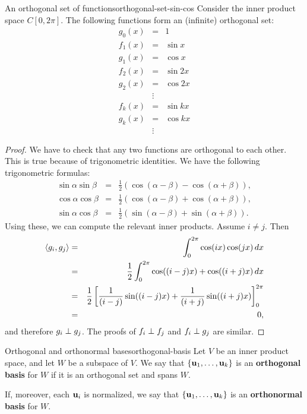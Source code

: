 \begin{example}{An orthogonal set of functions}{orthogonal-set-sin-cos}
  Consider the inner product space $C[0,2\pi]$. The following
  functions form an (infinite) orthogonal set:
  \begin{eqnarray*}
    g_0(x) &=& 1 \\
    f_1(x) &=& \sin x \\
    g_1(x) &=& \cos x \\
    f_2(x) &=& \sin 2x \\
    g_2(x) &=& \cos 2x \\
    &\vdots& \\
    f_k(x) &=& \sin kx \\
    g_k(x) &=& \cos kx \\
    &\vdots&
  \end{eqnarray*}
\end{example}

\begin{proof}
  We have to check that any two functions are orthogonal to each
  other. This is true because of trigonometric identities. We have the
  following trigonometric formulas:
  \begin{eqnarray*}
    \sin\alpha\sin\beta &=& \frac{1}{2}(\cos(\alpha-\beta) - \cos(\alpha+\beta)), \\
    \cos\alpha\cos\beta &=& \frac{1}{2}(\cos(\alpha-\beta) + \cos(\alpha+\beta)), \\
    \sin\alpha\cos\beta &=& \frac{1}{2}(\sin(\alpha-\beta) + \sin(\alpha+\beta)).
  \end{eqnarray*}
  Using these, we can compute the relevant inner products. Assume $i\neq j$. Then
  \begin{eqnarray*}
    \langle g_i,g_j\rangle
    &=& \int_{0}^{2\pi} \cos(ix)\cos(jx)\,dx \\
    &=& \frac{1}{2}\int_{0}^{2\pi} \cos((i-j)x) + \cos((i+j)x)\,dx \\
    &=& \frac{1}{2}\left[\frac{1}{(i-j)} \sin((i-j)x) + \frac{1}{(i+j)}
      \sin((i+j)x)\right]_0^{2\pi} \\
    &=& 0,
  \end{eqnarray*}
  and therefore $g_i\perp g_j$. The proofs of $f_i\perp f_j$ and
  $f_i\perp g_j$ are similar.
\end{proof}

\begin{definition}{Orthogonal and orthonormal bases}{orthogonal-basis}
  Let $V$ be an inner product space, and let $W$ be a subspace of
  $V$. We say that $\set{\vect{u}_1,\ldots,\vect{u}_k}$ is an
  \textbf{orthogonal basis}%
   for $W$ if it is an orthogonal set and
  spans $W$.
  \smallskip\smallskip

  If, moreover, each $\vect{u}_i$ is normalized, we say that
  $\set{\vect{u}_1,\ldots,\vect{u}_k}$ is an \textbf{orthonormal
    basis}%
   for $W$.
\end{definition}

